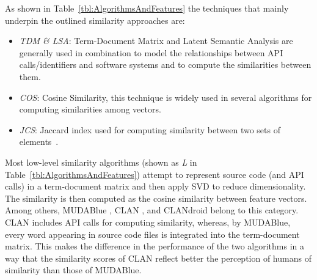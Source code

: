 As shown in Table~\ref{tbl:AlgorithmsAndFeatures} the techniques that mainly underpin the outlined similarity approaches are:

\begin{itemize}
	\item {\em TDM \& LSA}: Term-Document Matrix \cite{Collobert:2011:NLP:1953048.2078186} and Latent Semantic Analysis \cite{Landauer1998} are generally used in combination to model the relationships between API calls/identifiers and software systems and to compute the similarities between them.
	\item {\em COS}: Cosine Similarity, this technique is widely used in several algorithms for computing similarities among vectors.
	\item {\em JCS}: Jaccard index used for computing similarity between two sets of elements~\cite{jaccard}.
\end{itemize}


Most low-level similarity algorithms (shown as \textit{L} in Table~\ref{tbl:AlgorithmsAndFeatures}) attempt to represent source code (and API calls) in a term-document matrix and then apply SVD to reduce dimensionality. The similarity is then computed as the cosine similarity between feature vectors. Among others, MUDABlue \cite{10.1109/APSEC.2004.69}, CLAN \cite{McMillan:2012:DSS:2337223.2337267}, and CLANdroid \cite{10.1109ICPC.2016.7503721} belong to this category. CLAN includes API calls for computing similarity, whereas, by MUDABlue, every word appearing in source code files is integrated into the term-document matrix. This makes the difference in the performance of the two algorithms in a way that the similarity scores of CLAN reflect better the perception of humans of similarity than those of MUDABlue. %



